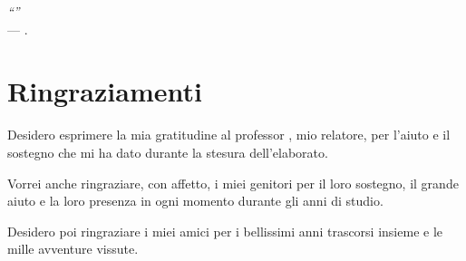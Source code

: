 \cleardoublepage
{}
{}

\begin{flushright}{
        \slshape
        ``''} \\
    \medskip
    --- .
\end{flushright}

\begingroup
\let\clearpage\relax
\let\cleardoublepage\relax
\let\cleardoublepage\relax

\chapter*{Ringraziamenti}

\noindent Desidero esprimere la mia gratitudine al professor \myProf, mio relatore, per l'aiuto e il sostegno che mi ha dato durante la stesura dell'elaborato.

\vspace{0.35cm}

\noindent Vorrei anche ringraziare, con affetto, i miei genitori per il loro sostegno, il grande aiuto e la loro presenza in ogni momento durante gli anni di studio.

\vspace{0.35cm}

\noindent Desidero poi ringraziare i miei amici per i bellissimi anni trascorsi insieme e le mille avventure vissute.

\vspace{0.75cm}

\noindent{\myLocation, \myTime}
\hfill \textit{\myName}

\endgroup
